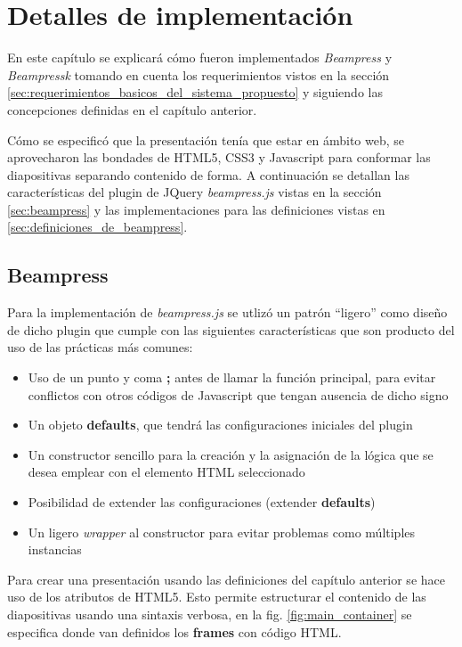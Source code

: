 \chapter{Detalles de implementación} %
\label{cha:detalles_de_implementacion}
	En este capítulo se explicará cómo fueron implementados \textit{Beampress} y \textit{Beampressk} tomando en cuenta los requerimientos vistos en la sección \ref{sec:requerimientos_basicos_del_sistema_propuesto} y siguiendo las concepciones definidas en el capítulo anterior.

	Cómo se especificó que la presentación tenía que estar en ámbito web, se aprovecharon las bondades de HTML5, CSS3 y Javascript para conformar las diapositivas separando contenido de forma. A continuación se detallan las características del plugin de JQuery \textit{beampress.js} vistas en la sección \ref{sec:beampress} y las implementaciones para las definiciones vistas en \ref{sec:definiciones_de_beampress}. 

	\section{Beampress} %
	\label{sec:beampress_imp}
	

		 Para la implementación de \textit{beampress.js} se utlizó un patrón ``ligero'' como diseño de dicho plugin \cite{smashingmagazine} que cumple con las siguientes características que son producto del uso de las prácticas más comunes:

		\begin{itemize}
			\item Uso de un punto y coma \textbf{;} antes de llamar la función principal, para evitar conflictos con otros códigos de Javascript que tengan ausencia de dicho signo
			\item Un objeto \textbf{defaults}, que tendrá las configuraciones iniciales del plugin
			\item Un constructor sencillo para la creación y la asignación de la lógica que se desea emplear con el elemento HTML seleccionado
			\item Posibilidad de extender las configuraciones (extender \textbf{defaults})
			\item Un ligero \textit{wrapper} al constructor para evitar problemas como múltiples instancias
		\end{itemize}

		Para crear una presentación usando las definiciones del capítulo anterior se hace uso de los atributos de HTML5. Esto permite estructurar el contenido de las diapositivas usando una sintaxis verbosa, en la fig. \ref{fig:main_container} se especifica donde van definidos los \textbf{frames} con código HTML.

